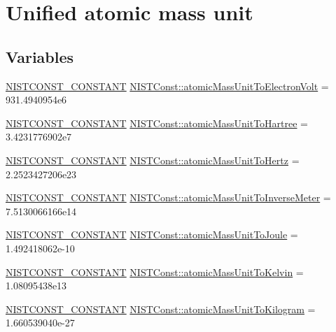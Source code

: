 \hypertarget{group___n_i_s_t_const-_atomic_mass_unit}{}\section{Unified atomic mass unit}
\label{group___n_i_s_t_const-_atomic_mass_unit}
\subsection*{Variables}
\begin{DoxyCompactItemize}
\item 
\mbox{\hyperlink{group___n_i_s_t_const-_macros_ga2b0fc1d7452373f816175dd86ce26729}{N\+I\+S\+T\+C\+O\+N\+S\+T\+\_\+\+C\+O\+N\+S\+T\+A\+NT}} \mbox{\hyperlink{group___n_i_s_t_const-_atomic_mass_unit_ga25c8b97ae8d15ad0a827672a167161fc}{N\+I\+S\+T\+Const\+::atomic\+Mass\+Unit\+To\+Electron\+Volt}} = 931.\+4940954e6
\item 
\mbox{\hyperlink{group___n_i_s_t_const-_macros_ga2b0fc1d7452373f816175dd86ce26729}{N\+I\+S\+T\+C\+O\+N\+S\+T\+\_\+\+C\+O\+N\+S\+T\+A\+NT}} \mbox{\hyperlink{group___n_i_s_t_const-_atomic_mass_unit_gabc1d9560508c08af70cd236ca08dfbff}{N\+I\+S\+T\+Const\+::atomic\+Mass\+Unit\+To\+Hartree}} = 3.\+4231776902e7
\item 
\mbox{\hyperlink{group___n_i_s_t_const-_macros_ga2b0fc1d7452373f816175dd86ce26729}{N\+I\+S\+T\+C\+O\+N\+S\+T\+\_\+\+C\+O\+N\+S\+T\+A\+NT}} \mbox{\hyperlink{group___n_i_s_t_const-_atomic_mass_unit_ga202ebb9eeb0f916c91b074d07ba403d5}{N\+I\+S\+T\+Const\+::atomic\+Mass\+Unit\+To\+Hertz}} = 2.\+2523427206e23
\item 
\mbox{\hyperlink{group___n_i_s_t_const-_macros_ga2b0fc1d7452373f816175dd86ce26729}{N\+I\+S\+T\+C\+O\+N\+S\+T\+\_\+\+C\+O\+N\+S\+T\+A\+NT}} \mbox{\hyperlink{group___n_i_s_t_const-_atomic_mass_unit_gaa66e75563e7a7c28bc3c4b5c4ab482a1}{N\+I\+S\+T\+Const\+::atomic\+Mass\+Unit\+To\+Inverse\+Meter}} = 7.\+5130066166e14
\item 
\mbox{\hyperlink{group___n_i_s_t_const-_macros_ga2b0fc1d7452373f816175dd86ce26729}{N\+I\+S\+T\+C\+O\+N\+S\+T\+\_\+\+C\+O\+N\+S\+T\+A\+NT}} \mbox{\hyperlink{group___n_i_s_t_const-_atomic_mass_unit_ga8c1405e0299d1388f1452bf4e04778f9}{N\+I\+S\+T\+Const\+::atomic\+Mass\+Unit\+To\+Joule}} = 1.\+492418062e-\/10
\item 
\mbox{\hyperlink{group___n_i_s_t_const-_macros_ga2b0fc1d7452373f816175dd86ce26729}{N\+I\+S\+T\+C\+O\+N\+S\+T\+\_\+\+C\+O\+N\+S\+T\+A\+NT}} \mbox{\hyperlink{group___n_i_s_t_const-_atomic_mass_unit_ga74d5a7e0d6f6182731b839a578353769}{N\+I\+S\+T\+Const\+::atomic\+Mass\+Unit\+To\+Kelvin}} = 1.\+08095438e13
\item 
\mbox{\hyperlink{group___n_i_s_t_const-_macros_ga2b0fc1d7452373f816175dd86ce26729}{N\+I\+S\+T\+C\+O\+N\+S\+T\+\_\+\+C\+O\+N\+S\+T\+A\+NT}} \mbox{\hyperlink{group___n_i_s_t_const-_atomic_mass_unit_ga72ba2b08855b26ea2477c3e8104bbc16}{N\+I\+S\+T\+Const\+::atomic\+Mass\+Unit\+To\+Kilogram}} = 1.\+660539040e-\/27
\end{DoxyCompactItemize}


